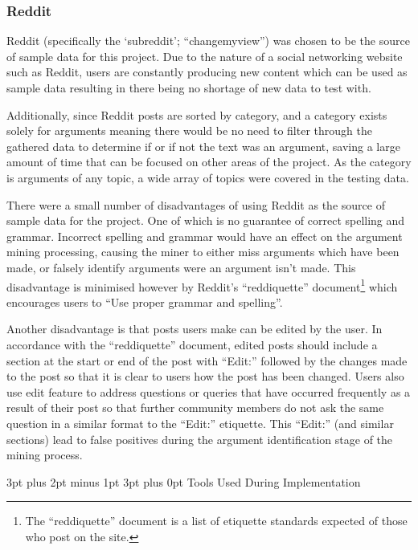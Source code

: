 \documentclass[12pt,a4paper]{article}
\makeatletter
\renewcommand\subsection{\@startsection {subsection}{1}{2mm} %
                               {3pt plus 2pt minus 1pt} %
                               {3pt plus 0pt} %
                               {\normalfont\bfseries}}
\makeatother
\begin{document}
\subsubsection{Reddit}

Reddit (specifically the `subreddit'; ``changemyview'') was chosen to be the source of sample data for this project. Due to the nature of a social networking website such as Reddit, users are constantly producing new content which can be used as sample data resulting in there being no shortage of new data to test with.

Additionally, since Reddit posts are sorted by category, and a category exists solely for arguments meaning there would be no need to filter through the gathered data to determine if or if not the text was an argument, saving a large amount of time that can be focused on other areas of the project. As the category is arguments of any topic, a wide array of topics were covered in the testing data.

There were a small number of disadvantages of using Reddit as the source of sample data for the project. One of which is no guarantee of correct spelling and grammar.  Incorrect spelling and grammar would have an effect on the argument mining processing, causing the miner to either miss arguments which have been made, or falsely identify arguments were an argument isn't made. This disadvantage is minimised however by Reddit's ``reddiquette'' document\footnote{The ``reddiquette'' document is a list of etiquette standards expected of those who post on the site.} which encourages users to ``Use proper grammar and spelling''.

Another disadvantage is that posts users make can be edited by the user. In accordance with the ``reddiquette'' document, edited posts should include a section at the start or end of the post with ``Edit:'' followed by the changes made to the post so that it is clear to users how the post has been changed. Users also use edit feature to address questions or queries that have occurred frequently as a result of their post so that further community members do not ask the same question in a similar format to the ``Edit:'' etiquette. This ``Edit:'' (and similar sections) lead to false positives during the argument identification stage of the mining process.

\subsection{Tools Used During Implementation}
\end{document}
